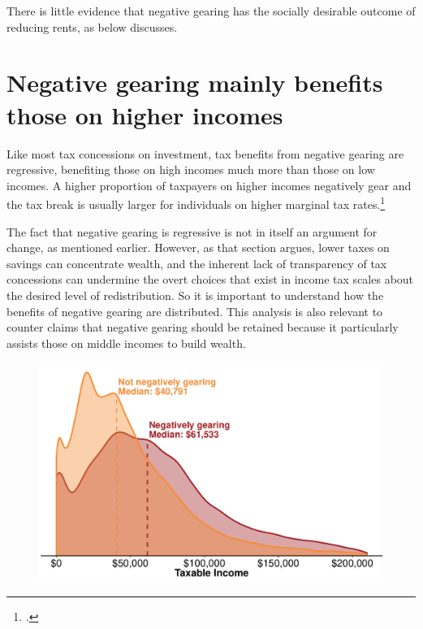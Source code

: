 There is little evidence that negative gearing has the socially desirable outcome of reducing rents, as  below discusses.

\section{Negative gearing mainly benefits those on higher incomes}\label{NG-benefits-those-on-higher-incomes}
Like most tax concessions on investment, tax benefits from negative gearing are regressive, benefiting those on high incomes much more than those on low incomes. A higher proportion of taxpayers on higher incomes negatively gear and the tax break is usually larger for individuals on higher marginal tax rates.\footcites{FinancialSystemsInquiry2015}{Grudnoff2015}

The fact that negative gearing is regressive is not in itself an argument for change, as mentioned earlier\DEVIATION{}. 
However, as that section argues, lower taxes on savings can concentrate wealth, and the inherent lack of transparency of tax concessions can undermine the overt choices that exist in income tax scales about the desired level of redistribution. 
So it is important to understand how the benefits of negative gearing are distributed. 
This analysis is also relevant to counter claims that negative gearing should be retained because it particularly assists those on middle incomes to build wealth. 

\begin{figure}

\includegraphics[width=\columnwidth]{CGT-NG-atlas//tx-inc-distr-by-NG-1}
\end{figure}

